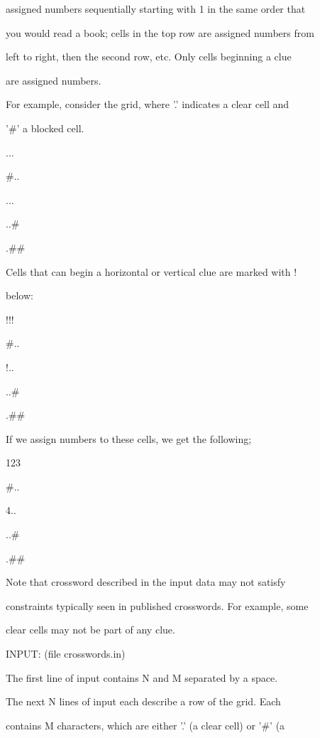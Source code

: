 \documentclass[12pt]{article}
\begin{document}
assigned numbers sequentially starting with 1 in the same order that

you would read a book; cells in the top row are assigned numbers from

left to right, then the second row, etc.  Only cells beginning a clue

are assigned numbers.



For example, consider the grid, where '.' indicates a clear cell and

'#' a blocked cell.



...

#..

...

..#

.##



Cells that can begin a horizontal or vertical clue are marked with !

below:



!!!

#..

!..

..#

.##



If we assign numbers to these cells, we get the following;



123

#..

4..

..#

.##



Note that crossword described in the input data may not satisfy

constraints typically seen in published crosswords.  For example, some

clear cells may not be part of any clue.



INPUT: (file crosswords.in)



The first line of input contains N and M separated by a space.



The next N lines of input each describe a row of the grid.  Each

contains M characters, which are either '.' (a clear cell) or '#' (a
\end{document}
